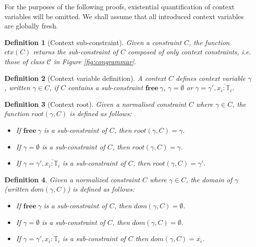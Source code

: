 \documentclass[preprint]{sigplanconf}
\newtheorem{defn}{Definition}
\newcommand{\figref}[1]{Figure \ref{#1}}
\newcommand{\free}[1]{\mathbf{free}\:#1}
\newcommand{\tinf}{\mathbb{T}}
\begin{document}
For the purposes of the following proofs, existential quantification of
context variables will be omitted. We shall assume that all introduced
context variables are globally fresh.

\begin{defn}[Context sub-constraint]
Given a constraint $C$, the function $ctx(C)$ returns the sub-constraint
of $C$ composed of only context constraints, i.e. those of class $\mathcal{C}$
in \figref{fig:congrammar}.
\end{defn}

\begin{defn}[Context variable definition]
A context $C$ {\it defines} context variable $\gamma$, written
$\gamma \in C$, if $C$ contains a sub-constraint $\free{\gamma}$,
$\gamma = \emptyset$ or $\gamma = \gamma', \overline{x_i : \tinf_i}$.
\end{defn}

\begin{defn}[Context root]
Given a normalised constraint $C$ where $\gamma \in C$, the 
function $root(\gamma, C)$ is defined as follows:

\begin{itemize}
\item If $\free{\gamma}$ is a sub-constraint of $C$, then $root(\gamma, C) = \gamma$.
\item If $\gamma = \emptyset$ is a sub-constraint of $C$, then $root(\gamma, C) = \gamma$.
\item If $\gamma = \gamma', \overline{x_i : \tinf_i}$ is a sub-constraint of $C$, then
$root(\gamma, C) = \gamma'$.
\end{itemize}
\end{defn}

\begin{defn}
Given a normalized constraint $C$ where $\gamma \in C$,
the {\it domain} of $\gamma$ (written $dom(\gamma, C)$) is defined as follows:

\begin{itemize}
\item If $\free{\gamma}$ is a sub-constraint of $C$, 
then $dom(\gamma, C) = \emptyset$.
\item If $\gamma = \emptyset$ is a sub-constraint of $C$,
then $dom(\gamma, C) = \emptyset$.
\item If $\gamma = \gamma', \overline{x_i : \tinf_i}$ is a sub-constraint of $C$
then $dom(\gamma, C) = \overline{x_i}$.
\end{itemize}
\end{defn}
\end{document}

